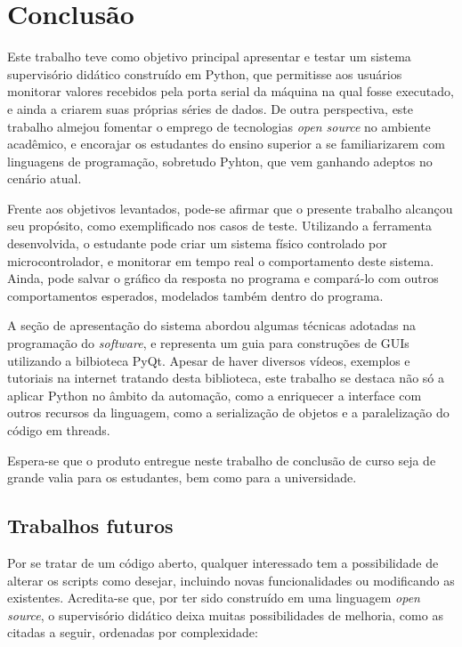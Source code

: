 \chapter{Conclusão}

Este trabalho teve como objetivo principal apresentar e testar um sistema supervisório didático construído em Python, que permitisse aos usuários monitorar valores recebidos pela porta serial da máquina na qual fosse executado, e ainda a criarem suas próprias séries de dados. De outra perspectiva, este trabalho almejou fomentar o emprego de tecnologias \textit{open source} no ambiente acadêmico, e encorajar os estudantes do ensino superior a se familiarizarem com linguagens de programação, sobretudo Pyhton, que vem ganhando adeptos no cenário atual.

Frente aos objetivos levantados, pode-se afirmar que o presente trabalho alcançou seu propósito, como exemplificado nos casos de teste. Utilizando a ferramenta desenvolvida, o estudante pode criar um sistema físico controlado por microcontrolador, e monitorar em tempo real o comportamento deste sistema. Ainda, pode salvar o gráfico da resposta no programa e compará-lo com outros comportamentos esperados, modelados também dentro do programa.

A seção de apresentação do sistema abordou algumas técnicas adotadas na programação do \textit{software}, e representa um guia para construções de GUIs utilizando a bilbioteca PyQt. Apesar de haver diversos vídeos, exemplos e tutoriais na internet tratando desta biblioteca, este trabalho se destaca não só a aplicar Python no âmbito da automação, como a enriquecer a interface com outros recursos da linguagem, como a serialização de objetos e a paralelização do código em threads.

Espera-se que o produto entregue neste trabalho de conclusão de curso seja de grande valia para os estudantes, bem como para a universidade.

\section{Trabalhos futuros}

Por se tratar de um código aberto, qualquer interessado tem a possibilidade de alterar os scripts como desejar, incluindo novas funcionalidades ou modificando as existentes. Acredita-se que, por ter sido construído em uma linguagem \textit{open source}, o supervisório didático deixa muitas possibilidades de melhoria, como as citadas a seguir, ordenadas por complexidade:

